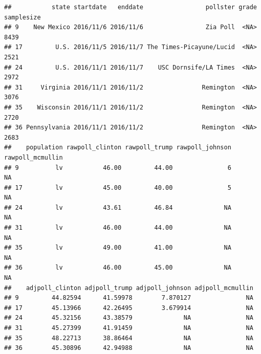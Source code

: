 \documentclass[
  12pt,
]{article}
\begin{document}
\begin{verbatim}
##           state startdate   enddate                 pollster grade samplesize
## 9    New Mexico 2016/11/6 2016/11/6                 Zia Poll  <NA>       8439
## 17         U.S. 2016/11/5 2016/11/7 The Times-Picayune/Lucid  <NA>       2521
## 24         U.S. 2016/11/1 2016/11/7    USC Dornsife/LA Times  <NA>       2972
## 31     Virginia 2016/11/1 2016/11/2                Remington  <NA>       3076
## 35    Wisconsin 2016/11/1 2016/11/2                Remington  <NA>       2720
## 36 Pennsylvania 2016/11/1 2016/11/2                Remington  <NA>       2683
##    population rawpoll_clinton rawpoll_trump rawpoll_johnson rawpoll_mcmullin
## 9          lv           46.00         44.00               6               NA
## 17         lv           45.00         40.00               5               NA
## 24         lv           43.61         46.84              NA               NA
## 31         lv           46.00         44.00              NA               NA
## 35         lv           49.00         41.00              NA               NA
## 36         lv           46.00         45.00              NA               NA
##    adjpoll_clinton adjpoll_trump adjpoll_johnson adjpoll_mcmullin
## 9         44.82594      41.59978        7.870127               NA
## 17        45.13966      42.26495        3.679914               NA
## 24        45.32156      43.38579              NA               NA
## 31        45.27399      41.91459              NA               NA
## 35        48.22713      38.86464              NA               NA
## 36        45.30896      42.94988              NA               NA
\end{verbatim}
\end{document}
